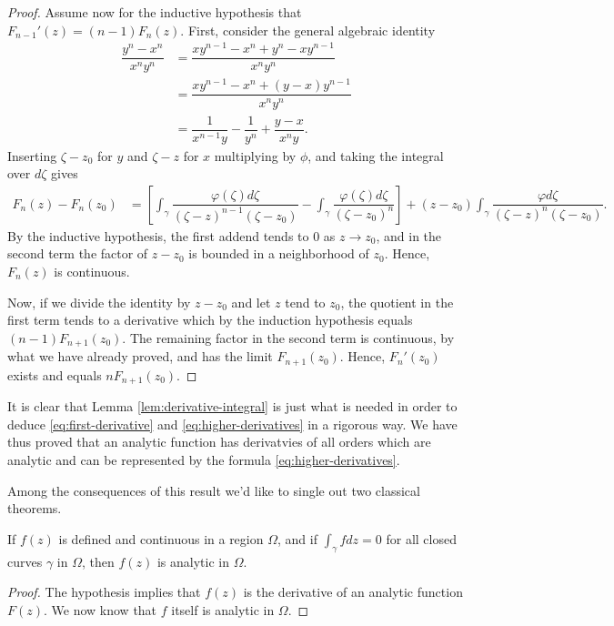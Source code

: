 \begin{proof}
Assume now for the inductive hypothesis that $F_{n-1}'(z)=(n-1)F_n(z)$. First, consider the general algebraic identity 
\begin{align*}
\dfrac{y^n-x^n}{x^ny^n} &=\dfrac{xy^{n-1}-x^n+y^n-xy^{n-1}}{x^ny^n} \\
&=\dfrac{xy^{n-1}-x^n+(y-x)y^{n-1}}{x^ny^n} \\
&=\dfrac{1}{x^{n-1}y}-\dfrac{1}{y^n}+\dfrac{y-x}{x^ny}.
\end{align*}
Inserting $\zeta-z_0$ for $y$ and $\zeta-z$ for $x$ multiplying by $\phi$, and taking the integral over $d\zeta$ gives\begin{align*}
F_n(z)-F_n(z_0) &=\left[\int_{\gamma} \dfrac{\varphi(\zeta)d\zeta}{(\zeta-z)^{n-1}(\zeta-z_0)} - \int_{\gamma} \dfrac{\varphi(\zeta)d\zeta}{(\zeta-z_0)^n}\right]+(z-z_0)\int_{\gamma}\dfrac{\varphi d\zeta}{(\zeta-z)^n(\zeta-z_0)}.
\end{align*}
By the inductive hypothesis, the first addend tends to $0$ as $z \rightarrow z_0$, and in the second term the factor of $z-z_0$ is bounded in a neighborhood of $z_0$. Hence, $F_n(z)$ is continuous.

Now, if we divide the identity by $z-z_0$ and let $z$ tend to $z_0$, the quotient in the first term tends to a derivative which by the induction hypothesis equals $(n-1)F_{n+1}(z_0)$. The remaining factor in the second term is continuous, by what we have already proved, and has the limit $F_{n+1}(z_0)$. Hence, $F_n'(z_0)$ exists and equals $nF_{n+1}(z_0)$.
\end{proof}

It is clear that Lemma \ref{lem:derivative-integral} is just what is needed in order to deduce \ref{eq:first-derivative} and \ref{eq:higher-derivatives} in a rigorous way. We have thus proved that an analytic function has derivatvies of all orders which are analytic and can be represented by the formula \ref{eq:higher-derivatives}.

Among the consequences of this result we'd like to single out two classical theorems.

\begin{theorem}[Morera]
If $f(z)$ is defined and continuous in a region $\Omega$, and if $\int_{\gamma} f dz=0$ for all closed curves $\gamma$ in $\Omega$, then $f(z)$ is analytic in $\Omega$.
\end{theorem}
\begin{proof}
The hypothesis implies that $f(z)$ is the derivative of an analytic function $F(z)$. We now know that $f$ itself is analytic in $\Omega$.
\end{proof}

